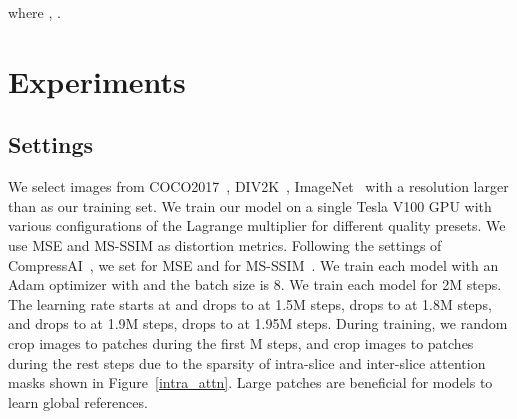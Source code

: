 \documentclass[sigconf]{acmart}
\begin{document}
where , .
\section{Experiments}\label{Sec:exp}
\subsection{Settings}
We select  images from COCO2017~\cite{lin2014microsoft},
DIV2K~\cite{Agustsson_2017_CVPR_Workshops}, ImageNet~\cite{ILSVRC15}
with a resolution larger than  as our training set.
We train our model on a single Tesla V100 GPU with various configurations
of the Lagrange multiplier  for different quality presets.
We use MSE and MS-SSIM as distortion metrics.
Following the settings of CompressAI~\cite{DBLP:journals/corr/abs-2011-03029},
we set 
for MSE and 
for MS-SSIM~\cite{wang2003multiscale}.
We train each model with an Adam optimizer with 
and the batch size is 8. We train each model for 2M steps.
The learning rate starts at  and drops to  at 1.5M steps,
drops to  at 1.8M steps, and drops to  at 1.9M steps,
drops to  at 1.95M steps.
During training, we random crop images to  patches during the
first M steps, and crop images to  patches
during the rest steps due to the sparsity of intra-slice and
inter-slice attention masks shown in Figure~\ref{intra_attn}.
Large patches are beneficial for models to learn global references.
\end{document}
